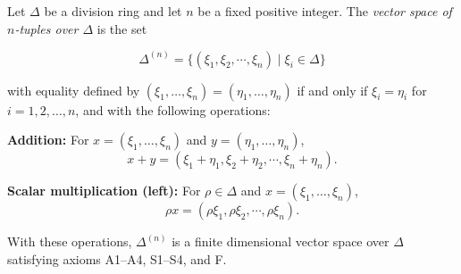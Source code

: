 Let $\Delta$ be a division ring and let $n$ be a fixed positive integer. The \emph{vector space of $n$-tuples over $\Delta$} is the set

$$\Delta^{(n)} = \{ (\xi_1, \xi_2, \cdots, \xi_n) \mid \xi_i \in \Delta \}$$

with equality defined by $(\xi_1, \ldots, \xi_n) = (\eta_1, \ldots, \eta_n)$ if and only if $\xi_i = \eta_i$ for $i = 1, 2, \ldots, n$, and with the following operations:

\textbf{Addition:} For $x = (\xi_1, \ldots, \xi_n)$ and $y = (\eta_1, \ldots, \eta_n)$,
$$x + y = (\xi_1 + \eta_1, \xi_2 + \eta_2, \cdots, \xi_n + \eta_n).$$

\textbf{Scalar multiplication (left):} For $\rho \in \Delta$ and $x = (\xi_1, \ldots, \xi_n)$,
$$\rho x = (\rho \xi_1, \rho \xi_2, \cdots, \rho \xi_n).$$

With these operations, $\Delta^{(n)}$ is a finite dimensional vector space over $\Delta$ satisfying axioms A1--A4, S1--S4, and F.
